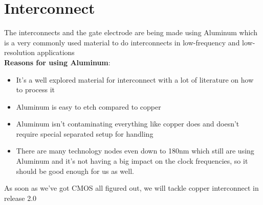 \section{Interconnect}
The interconnects and the gate electrode are being made using Aluminum which is a very commonly used material to do interconnects in low-frequency and low-resolution applications \\

\textbf{Reasons for using Aluminum}:\begin{itemize}
\item It's a well explored material for interconnect with a lot of literature on how to process it
\item Aluminum is easy to etch compared to copper
\item Aluminum isn't contaminating everything like copper does and doesn't require special separated setup for handling
\item There are many technology nodes even down to 180nm which still are using Aluminum and it's not having a big impact on the clock frequencies, so it should be good enough for us as well.
\end{itemize}

\begin{mdframed}[linewidth=2pt,linecolor=green]
As soon as we've got CMOS all figured out, we will tackle copper interconnect in release 2.0
\end{mdframed}

